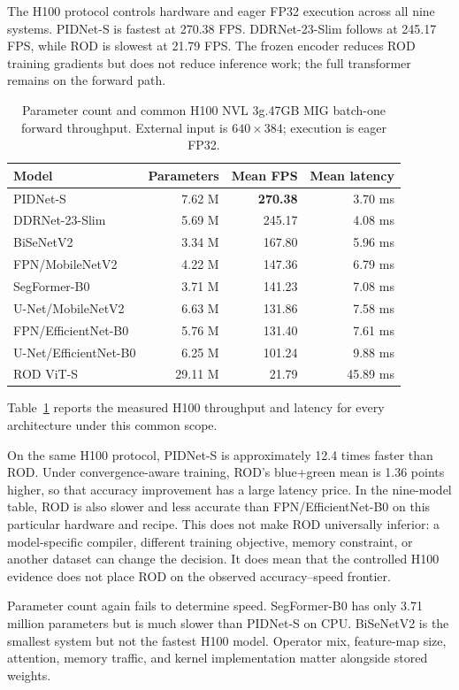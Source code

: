 The H100 protocol controls hardware and eager FP32 execution across all nine
systems. PIDNet-S is fastest at 270.38 FPS. DDRNet-23-Slim follows at 245.17
FPS, while ROD is slowest at 21.79 FPS. The frozen encoder reduces ROD training
gradients but does not reduce inference work; the full transformer remains on
the forward path.

\begin{table}[H]
\centering
\caption{Parameter count and common H100 NVL 3g.47GB MIG batch-one
forward throughput. External input is $640\times384$; execution is eager FP32.}
\label{tab:h100_comparison}
\small
\begin{tabular}{@{}lrrr@{}}
\toprule
\textbf{Model} & \textbf{Parameters} & \textbf{Mean FPS} & \textbf{Mean latency} \\
\midrule
PIDNet-S & 7.62 M & \textbf{270.38} & 3.70 ms \\
DDRNet-23-Slim & 5.69 M & 245.17 & 4.08 ms \\
BiSeNetV2 & 3.34 M & 167.80 & 5.96 ms \\
FPN/MobileNetV2 & 4.22 M & 147.36 & 6.79 ms \\
SegFormer-B0 & 3.71 M & 141.23 & 7.08 ms \\
U-Net/MobileNetV2 & 6.63 M & 131.86 & 7.58 ms \\
FPN/EfficientNet-B0 & 5.76 M & 131.40 & 7.61 ms \\
U-Net/EfficientNet-B0 & 6.25 M & 101.24 & 9.88 ms \\
ROD ViT-S & 29.11 M & 21.79 & 45.89 ms \\
\bottomrule
\end{tabular}
\end{table}

Table~\ref{tab:h100_comparison} reports the measured H100 throughput and
latency for every architecture under this common scope.

On the same H100 protocol, PIDNet-S is approximately 12.4 times faster than
ROD. Under convergence-aware training, ROD's blue+green mean is 1.36 points
higher, so that accuracy improvement has a large latency price. In the
nine-model table, ROD is also slower
and less accurate than FPN/EfficientNet-B0 on this particular hardware and
recipe. This does not make ROD universally inferior: a model-specific compiler,
different training objective, memory constraint, or another dataset can change
the decision. It does mean that the controlled H100 evidence does not place
ROD on the observed accuracy--speed frontier.

Parameter count again fails to determine speed. SegFormer-B0 has only 3.71
million parameters but is much slower than PIDNet-S on CPU. BiSeNetV2 is the
smallest system but not the fastest H100 model. Operator mix, feature-map size,
attention, memory traffic, and kernel implementation matter alongside stored
weights.

